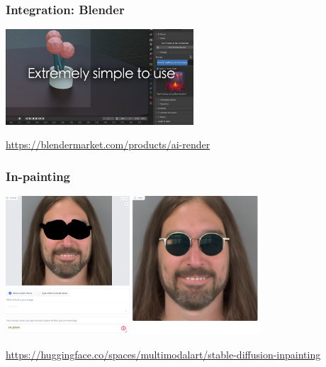 \documentclass[17pt,aspectratio=169,hyperref={pdfusetitle,colorlinks,allcolors=olive}]{beamer}
\begin{document}
\begin{frame}[fragile]
  \frametitle{Integration: Blender}

    \begin{center}
    \includegraphics[width=7cm]{figs/sd-blender}
  \end{center}

  \begin{flushright}
    {\scriptsize
    \url{https://blendermarket.com/products/ai-render} \\
    }
  \end{flushright}
  
\end{frame}

\begin{frame}[fragile]
  \frametitle{In-painting}

    \begin{center}
    \includegraphics[width=9.5cm]{figs/sd-inpainting}
  \end{center}

  \begin{flushright}
    {\scriptsize
    \url{https://huggingface.co/spaces/multimodalart/stable-diffusion-inpainting} \\
    }
  \end{flushright}
  
\end{frame}
\end{document}
